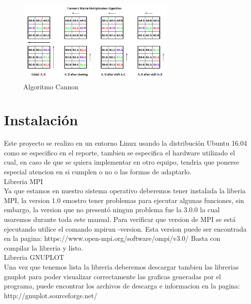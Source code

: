 \documentclass[12pt]{article}
\begin{document}
\begin{titlepage}
\begin{figure}[htb]
\centering
\includegraphics[width=0.7\textwidth]{c.png}
\caption{Algoritmo Cannon }
\end{figure}


\section{Instalación}
Este proyecto se realizo en un entorno Linux usando la distribución Ubuntu 16.04 como se especifico en el reporte, tambien se especifica el hardware utilizado el cual, en caso de que se quiera implementar en otro equipo, tendria que ponerse especial atencion en si cumplen o no o las formas de adaptarlo.\\

Libreria MPI\\
Ya que estamos en nuestro sistema operativo deberemos tener instalada la liberia MPI, la version 1.0 emostro tener problemas para ejecutar algunas funciones, sin embargo, la version que no presentó ningun problema fue la 3.0.0 la cual usaremos durante toda este manual. Para verificar que version de MPI se está ejecutando utilice el comando mpirun -version. Esta version puede ser encontrada en la pagina: https://www.open-mpi.org/software/ompi/v3.0/ Basta con compilar la libreria y listo.\\

Libreria GNUPLOT\\
Una vez que tenemos lista la libreria deberemos descargar tambien las librerias  gnuplot para poder visualizar correctamente las graficas generadas por el programa, puede encontrar los archivos de descarga e informacion en la pagina: http://gnuplot.sourceforge.net/\\


\end{titlepage}
\end{document}
